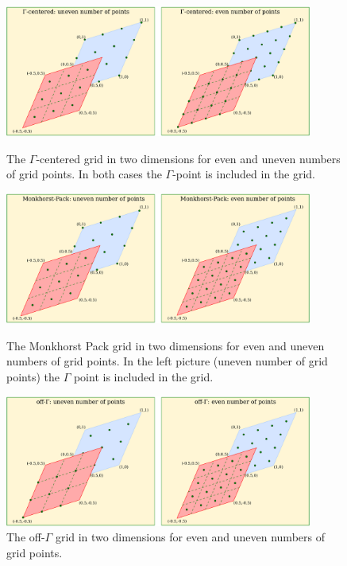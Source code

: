 %
\begin{figure}
\centering
  \begin{minipage}{0.95\linewidth}
    \centering
    \includegraphics[width=0.90\textwidth]{./G-centered.pdf}
    \caption{The $\Gamma$-centered grid in two dimensions for even and uneven numbers of grid points. In both cases the $\Gamma$-point is included in the grid.}
    \label{fig:G-centered}
  \end{minipage}
\hspace{0.0cm}
  \begin{minipage}{0.95\linewidth}
    \centering
    \includegraphics[width=0.90\textwidth]{./MP_grid.pdf}
    \caption{The Monkhorst Pack grid \cite{Monkhorst76} in two dimensions for even and uneven numbers of grid points. In the left picture (uneven number of grid points) the $\Gamma$ point is included in the grid.}
    \label{fig:MP_grid}
  \end{minipage}
\hspace{0.0cm}
  \begin{minipage}{0.95\linewidth}
    \centering
    \includegraphics[width=0.90\textwidth]{./off-gamma_grid.pdf}
    \caption{The off-$\Gamma$ grid in two dimensions for even and uneven numbers of grid points.}
    \label{fig:off-gamma_grid}
  \end{minipage}
\end{figure}
